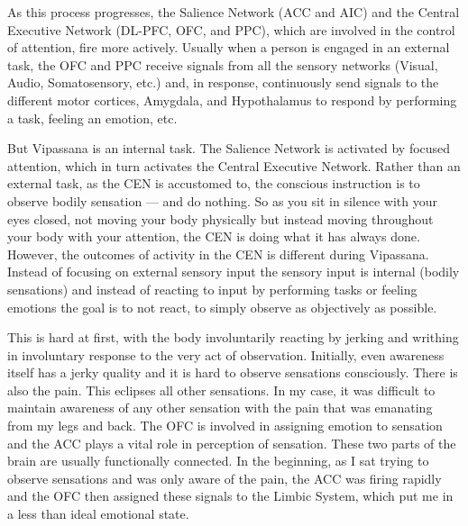 \documentclass[a4paper, amsfonts, amssymb, amsmath, reprint, showkeys, nofootinbib, twoside]{revtex4-1}
\begin{document}
As this process progresses, the Salience Network (ACC and AIC) and the Central Executive Network (DL-PFC, OFC,
and PPC), which are involved in the control of attention, fire more actively. Usually
when a person is engaged in an external task, the OFC and PPC receive signals
from all the sensory networks (Visual, Audio, Somatosensory, etc.) and, in response,
continuously send signals to the different motor cortices, Amygdala, and Hypothalamus to
respond by performing a task, feeling an emotion, etc.

But Vipassana is an internal task. The Salience Network is activated by focused
attention, which in turn activates the Central Executive Network. Rather than an
external task, as the CEN is accustomed to, the conscious instruction is to observe
bodily sensation --- and do nothing. So as you sit in silence with your eyes closed,
not moving your body physically but instead moving throughout your body with your
attention, the CEN is doing what it has always done. However, the outcomes of
activity in the CEN is different during Vipassana. Instead of focusing on
external sensory input the sensory input is internal (bodily sensations) and instead
of reacting to input by performing tasks or feeling emotions the goal is to not
react, to simply observe as objectively as possible.

This is hard at first, with the body involuntarily reacting by jerking and writhing
in involuntary response to the very act of observation. Initially, even awareness
itself has a jerky quality and it is hard to observe sensations consciously. There is also the
pain. This eclipses all other sensations. In my case, it was difficult to maintain
awareness of any other sensation with the pain that was emanating from my legs and
back. The OFC is involved in assigning emotion to sensation \cite{ofcemotion} and the
ACC plays a vital role in perception of sensation. These two parts of the brain are
usually functionally connected. In the beginning, as I sat trying to observe
sensations and was only aware of the pain, the ACC was firing rapidly and the
OFC then assigned these signals to the Limbic System, which
put me in a less than ideal emotional state.
\end{document}
